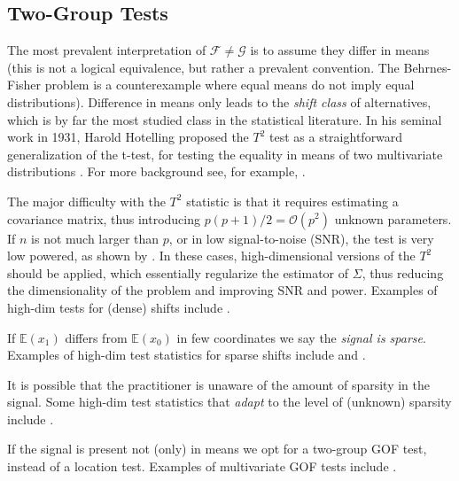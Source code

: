 \documentclass[oupdraft]{bio}
\begin{document}
\subsection{Two-Group Tests}
The most prevalent interpretation of $\mathcal{F}\neq \mathcal{G}$ is to assume they differ in means (this is not a logical equivalence, but rather a prevalent convention. The Behrnes-Fisher problem is a counterexample where equal means do not imply equal distributions). 
Difference in means only leads to the \emph{shift class} of alternatives, which is by far the most studied class in the statistical literature. 
In his seminal work in 1931, Harold Hotelling proposed the $T^2$ test as a straightforward generalization of the t-test, for testing the equality in means of two multivariate distributions \citep{hotelling_generalization_1931}. 
For more background see, for example, \cite{anderson_introduction_2003}.

The major difficulty with the $T^2$ statistic is that it requires estimating a covariance matrix, thus introducing $p(p+1)/2=\mathcal{O}(p^2)$ unknown parameters.
If $n$ is not much larger than $p$, or in low signal-to-noise (SNR), the test is very low powered, as shown by \cite{bai1996effect}. 
In these cases, high-dimensional versions of the $T^2$ should be applied, which essentially regularize the estimator of $\Sigma$, thus reducing the dimensionality of the problem and improving SNR and power.
Examples of high-dim tests for (dense) shifts include 
\cite{dempster1958high,bai1996effect,schafer_shrinkage_2005,goeman2006testing,srivastava_test_2008,chen_two-sample_2010,lopes2011more,ahmad2014u,thulin2014high,feng2015note}.

If $\mathbb{E}(x_1)$ differs from $\mathbb{E}(x_0)$ in few coordinates we say the \emph{signal is sparse}.
Examples of high-dim test statistics for sparse shifts include \cite{cai_two-sample_2013} and \cite{chang2014simulation}.

It is possible that the practitioner is unaware of the amount of sparsity in the signal. 
Some high-dim test statistics that \emph{adapt} to the level of (unknown) sparsity include \cite{simes1986improved,donoho2004higher,zhong2013tests,shen2015adaptive,moscovich2016exact}.

If the signal is present not (only) in means we opt for a two-group GOF test, instead of a location test. 
Examples of multivariate GOF tests include \cite{bickel1969distribution,friedman1979multivariate,hall2002permutation,szekely2004testing,Biau2005,Rosenbaum2005,eric2008testing,perez2009estimation,vayatis_auc_2009,gretton_kernel_2012-1}.
\end{document}
